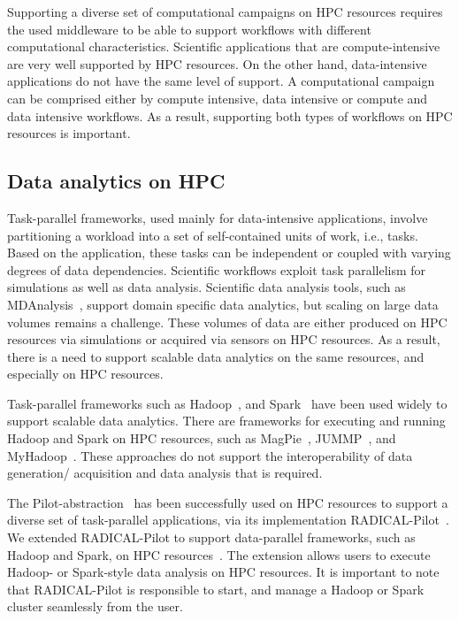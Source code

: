 \label{current_research}
Supporting a diverse set of computational campaigns on HPC resources requires the used middleware to be able to support workflows with different computational characteristics.
Scientific applications that are compute-intensive are very well supported by HPC resources.
On the other hand, data-intensive applications do not have the same level of support.
A computational campaign can be comprised either by compute intensive, data intensive or compute and data intensive workflows.
As a result, supporting both types of workflows on HPC resources is important.

\subsection{Data analytics on HPC}
\label{data_analysis_hpc}
Task-parallel frameworks, used mainly for data-intensive applications, involve partitioning a workload into a set of self-contained units of work, i.e., tasks. 
Based on the application, these tasks can be independent or coupled with varying degrees of data dependencies. 
Scientific workflows exploit task parallelism for simulations as well as data analysis.
Scientific data analysis tools, such as MDAnalysis~\cite{gowers2016mdanalysis,michaud2011mdanalysis}, support domain specific data analytics, but scaling on large data volumes remains a challenge.
These volumes of data are either produced on HPC resources via simulations or acquired via sensors on HPC resources.
As a result, there is a need to support scalable data analytics on the same resources, and especially on HPC resources.

Task-parallel frameworks such as Hadoop~\cite{hadoop}, and Spark~\cite{zaharia2010spark} have been used widely to support scalable data analytics.
There are frameworks for executing and running Hadoop and Spark on HPC resources, such as MagPie~\cite{magpie}, JUMMP~\cite{moody2013jummp}, and MyHadoop~\cite{krishnan04myhadoop}.
These approaches do not support the interoperability of data generation/ acquisition and data analysis that is required.

The Pilot-abstraction~\cite{luckow2012pstar} has been successfully used on HPC resources to support a diverse set of task-parallel applications, via its implementation RADICAL-Pilot~\cite{merzky2019using}.
We extended RADICAL-Pilot to support data-parallel frameworks, such as Hadoop and Spark, on HPC resources~\cite{luckow2016hadoop}.
The extension allows users to execute Hadoop- or Spark-style data analysis on HPC resources.
It is important to note that RADICAL-Pilot is responsible to start, and manage a Hadoop or Spark cluster seamlessly from the user.


